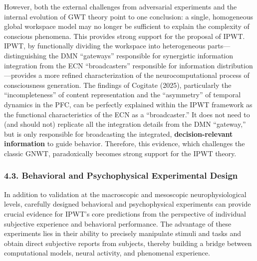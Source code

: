 \documentclass[
  a4paper]{article}
\begin{document}
However, both the external challenges from adversarial experiments and
the internal evolution of GWT theory point to one conclusion: a single,
homogeneous global workspace model may no longer be sufficient to
explain the complexity of conscious phenomena. This provides strong
support for the proposal of IPWT. IPWT, by functionally dividing the
workspace into heterogeneous parts---distinguishing the DMN ``gateways''
responsible for synergistic information integration from the ECN
``broadcasters'' responsible for information distribution---provides a
more refined characterization of the neurocomputational process of
consciousness generation. The findings of Cogitate (2025), particularly
the ``incompleteness'' of content representation and the ``asymmetry''
of temporal dynamics in the PFC, can be perfectly explained within the
IPWT framework as the functional characteristics of the ECN as a
``broadcaster.'' It does not need to (and should not) replicate all the
integration details from the DMN ``gateway,'' but is only responsible
for broadcasting the integrated, \textbf{decision-relevant information}
to guide behavior. Therefore, this evidence, which challenges the
classic GNWT, paradoxically becomes strong support for the IPWT theory.

\subsubsection{4.3. Behavioral and Psychophysical Experimental
Design}\label{behavioral-and-psychophysical-experimental-design}

In addition to validation at the macroscopic and mesoscopic
neurophysiological levels, carefully designed behavioral and
psychophysical experiments can provide crucial evidence for IPWT's core
predictions from the perspective of individual subjective experience and
behavioral performance. The advantage of these experiments lies in their
ability to precisely manipulate stimuli and tasks and obtain direct
subjective reports from subjects, thereby building a bridge between
computational models, neural activity, and phenomenal experience.
\end{document}
